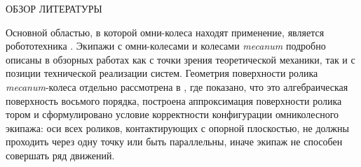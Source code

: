ОБЗОР ЛИТЕРАТУРЫ


Основной областью, в которой омни-колеса находят применение, является робототехника \cite{Seeni2010,Martynenko2005,GolubevSnake2004}. Экипажи с омни-колесами и колесами \textit{mecanum} \cite{Ilon} подробно описаны в обзорных работах  \cite{Campion1996,Zimmermann2009,ChungIagnemma2016,Kanjanawanishkul2015,Adascalitei2011} как с точки зрения теоретической механики, так и с позиции технической реализации систем. Геометрия поверхности ролика \textit{mecanum}-колеса отдельно рассмотрена в \cite{Gfrerrer2008}, где показано, что это алгебраическая поверхность восьмого порядка, построена аппроксимация поверхности ролика тором и сформулировано условие корректности конфигурации омниколесного экипажа: оси всех роликов, контактирующих с опорной плоскостью, не должны проходить через одну точку или быть параллельны, иначе экипаж не способен совершать ряд движений.


